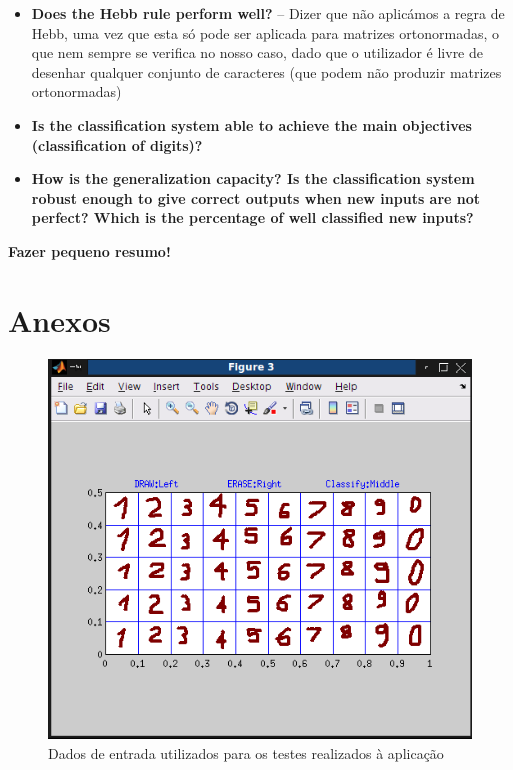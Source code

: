\documentclass{article}
\begin{document}
\begin{itemize}
\item \textbf{Does the Hebb rule perform well?} -- Dizer que não aplicámos a regra de Hebb, uma vez que esta só pode ser aplicada para matrizes ortonormadas, o que nem sempre se verifica no nosso caso, dado que o utilizador é livre de desenhar qualquer conjunto de caracteres (que podem não produzir matrizes ortonormadas)

\item \textbf{Is the classification system able to achieve the main objectives (classification of digits)?}

\item \textbf{How is the generalization capacity? Is the classification system robust enough to give correct outputs when new inputs are not perfect? Which is the percentage of well classified new inputs?}
\end{itemize}

\textbf{Fazer pequeno resumo!}

\pagebreak

\section{Anexos}

\begin{figure}[h]
  \centering
      \includegraphics[scale=0.3]{Input.png}
  \caption{Dados de entrada utilizados para os testes realizados à aplicação}
\end{figure}
\end{document}
